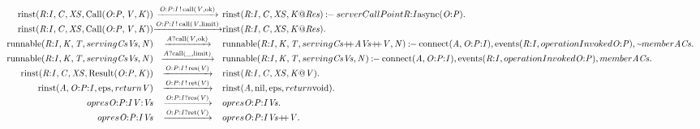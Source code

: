 \[\begin{array}{r@{}c@{}l}
\\\Prule{\Tstep{\Trinst{\Tr{\Tvar{R}}{\Tvar{I}}}{\Tvar{C}}{\Tvar{XS}}{\TrteCall{\To{\Tvar{O}}{\Tvar{P}}}{\Tvar{V}}{\Tvar{K}}}}{\Tsay{\Top{\Tvar{O}}{\Tvar{P}}{\Tvar{I}}}{\Tcall{\Tvar{V}}{\Tatom{ok}}}}{\Trinst{\Tr{\Tvar{R}}{\Tvar{I}}}{\Tvar{C}}{\Tvar{XS}}{\Tap{\Tvar{K}}{\Tvar{Res}}}}}{\TserverCallPoint{\Tr{\Tvar{R}}{\Tvar{I}}}{\Tasync{\To{\Tvar{O}}{\Tvar{P}}}}}.
\\\Pfact{\Tstep{\Trinst{\Tr{\Tvar{R}}{\Tvar{I}}}{\Tvar{C}}{\Tvar{XS}}{\TrteCall{\To{\Tvar{O}}{\Tvar{P}}}{\Tvar{V}}{\Tvar{K}}}}{\Tsay{\Top{\Tvar{O}}{\Tvar{P}}{\Tvar{I}}}{\Tcall{\Tvar{V}}{\Tatom{limit}}}}{\Trinst{\Tr{\Tvar{R}}{\Tvar{I}}}{\Tvar{C}}{\Tvar{XS}}{\Tap{\Tvar{K}}{\Tvar{Res}}}}}.
\\\Prule{\Tstep{\Trunnable{\Tr{\Tvar{R}}{\Tvar{I}}}{\Tvar{K}}{\Tvar{T}}{\Tserving{\Tvar{Cs}}{\Tvar{Vs}}}{\Tvar{N}}}{\Thear{\Tvar{A}}{\Tcall{\Tvar{V}}{\Tatom{ok}}}}{\Trunnable{\Tr{\Tvar{R}}{\Tvar{I}}}{\Tvar{K}}{\Tvar{T}}{\Tserving{\Tseq{\Tvar{Cs}}{\Tvar{A}}}{\Tseq{\Tvar{Vs}}{\Tvar{V}}}}{\Tvar{N}}}}{\Tconnect{\Tvar{A}}{\Top{\Tvar{O}}{\Tvar{P}}{\Tvar{I}}},\Tevents{\Tr{\Tvar{R}}{\Tvar{I}}}{\ToperationInvoked{\To{\Tvar{O}}{\Tvar{P}}}},\Pnegate{\Tmember{\Tvar{A}}{\Tvar{Cs}}}}.
\\\Prule{\Tstep{\Trunnable{\Tr{\Tvar{R}}{\Tvar{I}}}{\Tvar{K}}{\Tvar{T}}{\Tserving{\Tvar{Cs}}{\Tvar{Vs}}}{\Tvar{N}}}{\Thear{\Tvar{A}}{\Tcall{\_}{\Tatom{limit}}}}{\Trunnable{\Tr{\Tvar{R}}{\Tvar{I}}}{\Tvar{K}}{\Tvar{T}}{\Tserving{\Tvar{Cs}}{\Tvar{Vs}}}{\Tvar{N}}}}{\Tconnect{\Tvar{A}}{\Top{\Tvar{O}}{\Tvar{P}}{\Tvar{I}}},\Tevents{\Tr{\Tvar{R}}{\Tvar{I}}}{\ToperationInvoked{\To{\Tvar{O}}{\Tvar{P}}}},\Tmember{\Tvar{A}}{\Tvar{Cs}}}.
\\\Pfact{\Tstep{\Trinst{\Tr{\Tvar{R}}{\Tvar{I}}}{\Tvar{C}}{\Tvar{XS}}{\TrteResult{\To{\Tvar{O}}{\Tvar{P}}}{\Tvar{K}}}}{\Tsay{\Top{\Tvar{O}}{\Tvar{P}}{\Tvar{I}}}{\Tres{\Tvar{V}}}}{\Trinst{\Tr{\Tvar{R}}{\Tvar{I}}}{\Tvar{C}}{\Tvar{XS}}{\Tap{\Tvar{K}}{\Tvar{V}}}}}.
\\\Pfact{\Tstep{\Trinst{\Tvar{A}}{\Top{\Tvar{O}}{\Tvar{P}}{\Tvar{I}}}{\Tatom{eps}}{\Treturn{\Tvar{V}}}}{\Tsay{\Top{\Tvar{O}}{\Tvar{P}}{\Tvar{I}}}{\Tret{\Tvar{V}}}}{\Trinst{\Tvar{A}}{\Tatom{nil}}{\Tatom{eps}}{\Treturn{\Tatom{void}}}}}.
\\\Pfact{\Tstep{\Topres{\Top{\Tvar{O}}{\Tvar{P}}{\Tvar{I}}}{\Tcons{\Tvar{V}}{\Tvar{Vs}}}}{\Thear{\Top{\Tvar{O}}{\Tvar{P}}{\Tvar{I}}}{\Tres{\Tvar{V}}}}{\Topres{\Top{\Tvar{O}}{\Tvar{P}}{\Tvar{I}}}{\Tvar{Vs}}}}.
\\\Pfact{\Tstep{\Topres{\Top{\Tvar{O}}{\Tvar{P}}{\Tvar{I}}}{\Tvar{Vs}}}{\Thear{\Top{\Tvar{O}}{\Tvar{P}}{\Tvar{I}}}{\Tret{\Tvar{V}}}}{\Topres{\Top{\Tvar{O}}{\Tvar{P}}{\Tvar{I}}}{\Tseq{\Tvar{Vs}}{\Tvar{V}}}}}.

\end{array}\]
